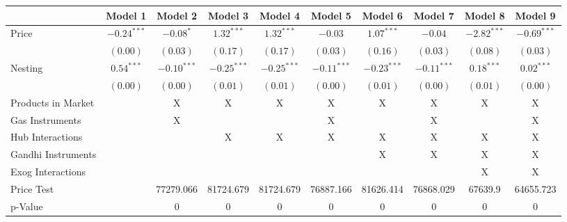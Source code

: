 
\begin{tabular}{l c c c c c c c c c}
\toprule
 & Model 1 & Model 2 & Model 3 & Model 4 & Model 5 & Model 6 & Model 7 & Model 8 & Model 9 \\
\midrule
Price                       & $-0.24^{***}$ & $-0.08^{*}$   & $1.32^{***}$  & $1.32^{***}$  & $-0.03$       & $1.07^{***}$  & $-0.04$       & $-2.82^{***}$ & $-0.69^{***}$ \\
                            & $(0.00)$      & $(0.03)$      & $(0.17)$      & $(0.17)$      & $(0.03)$      & $(0.16)$      & $(0.03)$      & $(0.08)$      & $(0.03)$      \\
Nesting                     & $0.54^{***}$  & $-0.10^{***}$ & $-0.25^{***}$ & $-0.25^{***}$ & $-0.11^{***}$ & $-0.23^{***}$ & $-0.11^{***}$ & $0.18^{***}$  & $0.02^{***}$  \\
                            & $(0.00)$      & $(0.00)$      & $(0.01)$      & $(0.01)$      & $(0.00)$      & $(0.01)$      & $(0.00)$      & $(0.01)$      & $(0.00)$      \\
\midrule
Products in Market          &               & X             & X             & X             & X             & X             & X             & X             & X             \\
Gas Instruments             &               & X             &               &               & X             &               & X             &               & X             \\
Hub Interactions            &               &               & X             & X             & X             & X             & X             & X             & X             \\
Gandhi Instruments          &               &               &               &               &               & X             & X             & X             & X             \\
Exog Interactions           &               &               &               &               &               &               &               & X             & X             \\
Price Test                  &               & 77279.066     & 81724.679     & 81724.679     & 76887.166     & 81626.414     & 76868.029     & 67639.9       & 64655.723     \\
p-Value                     &               & 0             & 0             & 0             & 0             & 0             & 0             & 0             & 0             \\

\end{tabular}
